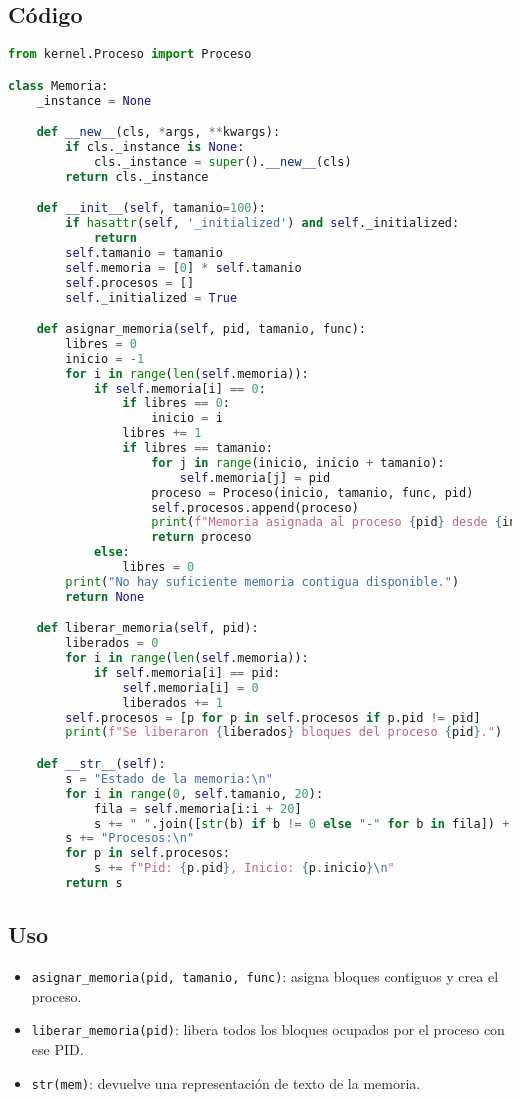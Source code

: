 \documentclass[11pt]{article}
\begin{document}
\subsection{Código}
\begin{lstlisting}[language=Python, caption={Memoria.py}]
from kernel.Proceso import Proceso

class Memoria:
    _instance = None

    def __new__(cls, *args, **kwargs):
        if cls._instance is None:
            cls._instance = super().__new__(cls)
        return cls._instance

    def __init__(self, tamanio=100):
        if hasattr(self, '_initialized') and self._initialized:
            return
        self.tamanio = tamanio
        self.memoria = [0] * self.tamanio
        self.procesos = []
        self._initialized = True

    def asignar_memoria(self, pid, tamanio, func):
        libres = 0
        inicio = -1
        for i in range(len(self.memoria)):
            if self.memoria[i] == 0:
                if libres == 0:
                    inicio = i
                libres += 1
                if libres == tamanio:
                    for j in range(inicio, inicio + tamanio):
                        self.memoria[j] = pid
                    proceso = Proceso(inicio, tamanio, func, pid)
                    self.procesos.append(proceso)
                    print(f"Memoria asignada al proceso {pid} desde {inicio} hasta {inicio + tamanio - 1}")
                    return proceso
            else:
                libres = 0
        print("No hay suficiente memoria contigua disponible.")
        return None

    def liberar_memoria(self, pid):
        liberados = 0
        for i in range(len(self.memoria)):
            if self.memoria[i] == pid:
                self.memoria[i] = 0
                liberados += 1
        self.procesos = [p for p in self.procesos if p.pid != pid]
        print(f"Se liberaron {liberados} bloques del proceso {pid}.")

    def __str__(self):
        s = "Estado de la memoria:\n"
        for i in range(0, self.tamanio, 20):
            fila = self.memoria[i:i + 20]
            s += " ".join([str(b) if b != 0 else "-" for b in fila]) + "\n"
        s += "Procesos:\n"
        for p in self.procesos:
            s += f"Pid: {p.pid}, Inicio: {p.inicio}\n"
        return s
\end{lstlisting}

\subsection{Uso}
\begin{itemize}
    \item \texttt{asignar\_memoria(pid, tamanio, func)}: asigna bloques contiguos y crea el proceso.
    \item \texttt{liberar\_memoria(pid)}: libera todos los bloques ocupados por el proceso con ese PID.
    \item \texttt{str(mem)}: devuelve una representación de texto de la memoria.
\end{itemize}
\end{document}
